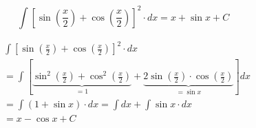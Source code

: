 \documentclass[14pt,fleqn]{extarticle}
\newcommand\expa{\sin \left(\frac{x}{2} \right)}
\newcommand\expb{\cos \left(\frac{x}{2} \right)}
\newcommand\expc{ \left[\expa + \expb \right]}
\begin{document}
 
\begin{snippet}
    
    \incorrect
    
    \[ \int \expc^2\cdot dx = x + \sin x + C \]
    
    \reason
    
    \begin{align}
	&\int \expc^2\cdot dx \\
	&= \int \left[\underbrace{\sin^2 \left(\frac{x}{2} \right) + \cos^2 \left(\frac{x}{2} \right)}_{=1} + \underbrace{2\expa\cdot\expb}_{=\sin x}\right]dx \\
	&= \int \left(1 + \sin x \right)\cdot dx = \int dx + \int \sin x\cdot dx  \\
	&= x -\cos x + C 
\end{align}
    
\end{snippet} 
\end{document}
